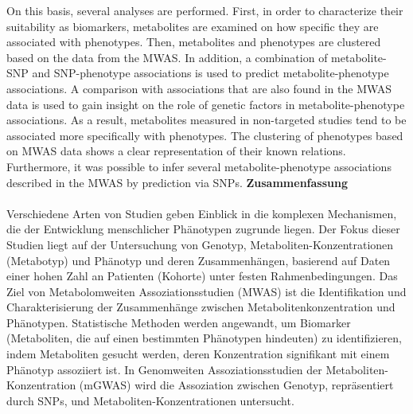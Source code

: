 \documentclass[a4paper, %
  12pt, %
  twoside
  ]{report} %
\numberwithin{figure}{chapter}
\begin{document}
On this basis, several analyses are performed. First, in order to characterize their suitability as biomarkers, metabolites are examined on how specific they are associated with phenotypes. Then, metabolites and phenotypes are clustered based on the data from the MWAS. In addition, a combination of metabolite-SNP and SNP-phenotype associations is used to predict metabolite-phenotype associations. A comparison with associations that are also found in the MWAS data is used to gain insight on the role of genetic factors in metabolite-phenotype associations. As a result, metabolites measured in non-targeted studies tend to be associated more specifically with phenotypes. The clustering of phenotypes based on MWAS data shows a clear representation of their known relations. %
Furthermore, it was possible to infer several metabolite-phenotype associations described in the MWAS by prediction via SNPs.
\newpage
\thispagestyle{empty}
\textbf{ }
\newpage
\thispagestyle{empty}
\textbf{ }
\newline
{\Large\textbf{Zusammenfassung\\\\}}
Verschiedene Arten von Studien geben Einblick in die komplexen Mechanismen, die der Entwicklung menschlicher Phänotypen zugrunde liegen. Der Fokus dieser Studien liegt auf der Untersuchung von Genotyp, Metaboliten-Konzentrationen (Metabotyp) und Phänotyp und deren Zusammenhängen, basierend auf Daten einer hohen Zahl an Patienten (Kohorte) unter festen Rahmenbedingungen.
Das Ziel von Metabolomweiten Assoziationsstudien (MWAS) ist die Identifikation und Charakterisierung der Zusammenhänge zwischen Metabolitenkonzentration und Phänotypen. Statistische Methoden werden angewandt, um Biomarker (Metaboliten, die auf einen bestimmten Phänotypen hindeuten) zu identifizieren, indem Metaboliten gesucht werden, deren Konzentration signifikant mit einem Phänotyp assoziiert ist. In Genomweiten Assoziationsstudien der Metaboliten-Konzentration (mGWAS) wird die Assoziation zwischen Genotyp, repräsentiert durch SNPs, und Metaboliten-Konzentrationen untersucht.
\end{document}
